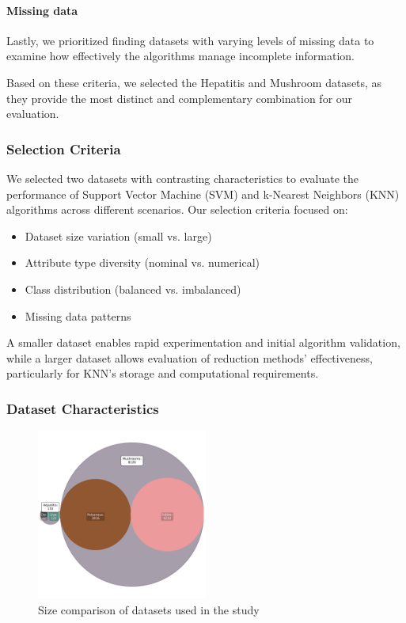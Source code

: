 \paragraph{Missing data} Lastly, we prioritized finding datasets with varying levels of missing data to examine how effectively the algorithms manage incomplete information.

Based on these criteria, we selected the Hepatitis and Mushroom datasets, as they provide the most distinct and complementary combination for our evaluation.
\subsubsection{Selection Criteria}
We selected two datasets with contrasting characteristics to evaluate the performance of Support Vector Machine (SVM) and k-Nearest Neighbors (KNN) algorithms across different scenarios. Our selection criteria focused on:

\begin{itemize}
    \item Dataset size variation (small vs. large)
    \item Attribute type diversity (nominal vs. numerical)
    \item Class distribution (balanced vs. imbalanced)
    \item Missing data patterns
\end{itemize}

A smaller dataset enables rapid experimentation and initial algorithm validation, while a larger dataset allows evaluation of reduction methods' effectiveness, particularly for KNN's storage and computational requirements.

\subsubsection{Dataset Characteristics}

\begin{figure}
    \centering
    \includegraphics[width=0.5\textwidth]{figures/dataset-partitions.png}
    \caption{Size comparison of datasets used in the study}
    \label{fig:dataset-partitions}
\end{figure}

